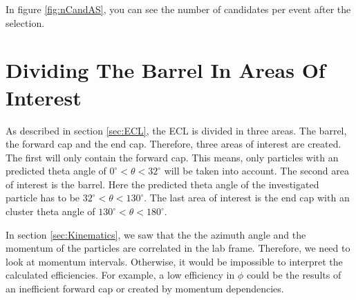 \documentclass[a4paper,11pt,twosided,final,german,openbib,pdftex,listof=totoc,bibliography=totoc]{scrbook}
\begin{document}
In figure \ref{fig:nCandAS}, you can see the number of candidates per event after the selection.






\section{Dividing The Barrel In Areas Of Interest}


As described in section \ref{sec:ECL}, the ECL is divided in three areas. The barrel, the forward cap and the end cap. Therefore, three areas of interest are created. The first will only contain the forward cap. This means, only particles with an predicted theta angle of $0^\circ <\theta<32^\circ$ will be taken into account. The second area of interest is the barrel. Here the predicted theta angle of the investigated particle has to be $32^\circ < \theta < 130^\circ$. The last area of interest is the end cap with an cluster theta angle of $130^\circ <\theta < 180^\circ$.  

In section \ref{sec:Kinematics}, we saw that the the azimuth angle and the momentum of the particles are correlated in the lab frame. Therefore, we need to look at momentum intervals. Otherwise, it would be impossible to interpret the calculated efficiencies. For example, a low efficiency in $\phi$ could be the results of an inefficient forward cap or created by momentum dependencies.
\end{document}
